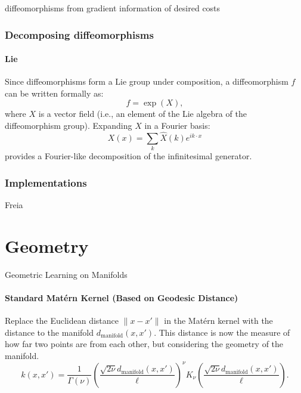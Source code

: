 \documentclass{article}
\theoremstyle{definition} \newtheorem{definition}{Definition}  \newtheorem{example}{Example}
\theoremstyle{remark} \newtheorem{remark}{Remark}
\newcounter{ct}
\begin{document}
diffeomorphisms from gradient information of desired costs \citep{lai2021parallelised}




\subsubsection{Decomposing diffeomorphisms}\label{sec:diff_dec}
\paragraph{Lie}
Since diffeomorphisms form a Lie group under composition, a diffeomorphism 
\( f \) can be written formally as:
\[
f = \exp(X),
\]
where \( X \) is a vector field (i.e., an element of the Lie algebra of the diffeomorphism group). Expanding \( X \) in a Fourier basis:
\[
X(x) = \sum_k \hat{X}(k) e^{i k \cdot x}
\]
provides a Fourier-like decomposition of the infinitesimal generator.

\subsubsection{Implementations}
Freia\citep{freia} %

\citep{dinh2016density} %

\citep{stimper2023normflows} %



\newpage
\section{Geometry}
Geometric Learning on Manifolds\citep{mostowsky2024geometrickernels}


\paragraph{Standard Matérn Kernel (Based on Geodesic Distance)}
Replace the Euclidean distance  $\| x - x' \|$  in the Matérn kernel with the distance to the manifold  $ d_{\text{manifold}}(x, x')$. 
This distance is now the measure of how far two points are from each other, but considering the geometry of the manifold.
\begin{equation}
k(x, x') = \frac{1}{\Gamma(\nu)} \left( \frac{\sqrt{2\nu} d_{\text{manifold}}(x, x')}{\ell} \right)^\nu K_\nu\left( \frac{\sqrt{2\nu} d_{\text{manifold}}(x, x')}{\ell} \right).
\end{equation}
\end{document}
